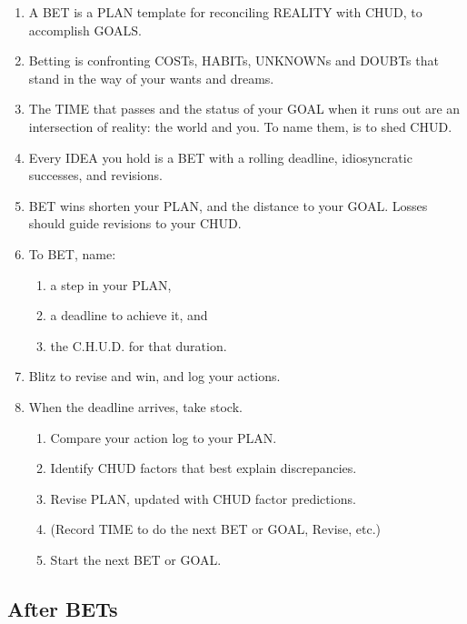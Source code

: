 \documentclass[
]{book}
\providecommand{\tightlist}{%
  \setlength{\itemsep}{0pt}\setlength{\parskip}{0pt}}
\begin{document}
\begin{enumerate}
\def\labelenumi{\arabic{enumi}.}
\setcounter{enumi}{22}
\tightlist
\item
  A BET is a PLAN template for reconciling REALITY with CHUD, to
  accomplish GOALS.
\item
  Betting is confronting COSTs, HABITs, UNKNOWNs and DOUBTs that
  stand in the way of your wants and dreams.
\item
  The TIME that passes and the status of your GOAL when it runs out are
  an intersection of reality: the world and you. To name them, is to shed
  CHUD.
\item
  Every IDEA you hold is a BET with a rolling deadline, idiosyncratic
  successes, and revisions.
\item
  BET wins shorten your PLAN, and the distance to your GOAL.
  Losses should guide revisions to your CHUD.
\item
  To BET, name:

  \begin{enumerate}
  \def\labelenumii{\arabic{enumii}.}
  \tightlist
  \item
    a step in your PLAN,
  \item
    a deadline to achieve it, and
  \item
    the C.H.U.D. for that duration.
  \end{enumerate}
\item
  Blitz to revise and win, and log your actions.
\item
  When the deadline arrives, take stock.

  \begin{enumerate}
  \def\labelenumii{\arabic{enumii}.}
  \tightlist
  \item
    Compare your action log to your PLAN.
  \item
    Identify CHUD factors that best explain discrepancies.
  \item
    Revise PLAN, updated with CHUD factor predictions.
  \item
    (Record TIME to do the next BET or GOAL, Revise, etc.)
  \item
    Start the next BET or GOAL.
  \end{enumerate}
\end{enumerate}

\hypertarget{after-bets}{%
\subsection{After BETs}\label{after-bets}}
\end{document}
